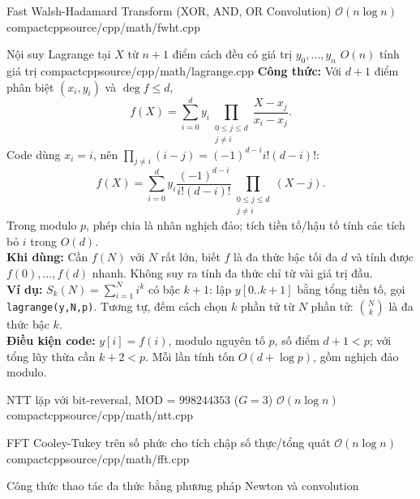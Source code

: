{Fast Walsh-Hadamard Transform (XOR, AND, OR Convolution)}
{$\mathcal{O}(n \log n)$}
{compactcpp}{source/cpp/math/fwht.cpp}

{Nội suy Lagrange tại $X$ từ $n+1$ điểm cách đều có giá trị $y_0,\dots,y_n$}
{$O(n)$ tính giá trị}
{compactcpp}{source/cpp/math/lagrange.cpp}
\textbf{Công thức:} Với $d+1$ điểm phân biệt $(x_i,y_i)$ và $\deg f\le d$,
\[
f(X)=\sum_{i=0}^{d}y_i\prod_{\substack{0\le j\le d\\j\ne i}}\frac{X-x_j}{x_i-x_j}.
\]
Code dùng $x_i=i$, nên $\prod_{j\ne i}(i-j)=(-1)^{d-i}i!(d-i)!$:
\[
f(X)=\sum_{i=0}^{d}y_i\frac{(-1)^{d-i}}{i!(d-i)!}
\prod_{\substack{0\le j\le d\\j\ne i}}(X-j).
\]
Trong modulo $p$, phép chia là nhân nghịch đảo; tích tiền tố/hậu tố tính các tích bỏ $i$ trong $O(d)$.\\
\textbf{Khi dùng:} Cần $f(N)$ với $N$ rất lớn, biết $f$ là đa thức bậc tối đa $d$ và tính được $f(0),\dots,f(d)$ nhanh. Không suy ra tính đa thức chỉ từ vài giá trị đầu.\\
\textbf{Ví dụ:} $S_k(N)=\sum_{i=1}^{N}i^k$ có bậc $k+1$: lập $y[0..k+1]$ bằng tổng tiền tố, gọi \texttt{lagrange(y,N,p)}. Tương tự, đếm cách chọn $k$ phần tử từ $N$ phần tử: $\binom{N}{k}$ là đa thức bậc $k$.\\
\textbf{Điều kiện code:} $y[i]=f(i)$, modulo nguyên tố $p$, số điểm $d+1<p$; với tổng lũy thừa cần $k+2<p$. Mỗi lần tính tốn $O(d+\log p)$, gồm nghịch đảo modulo.

{NTT lặp với bit-reversal, MOD = $998244353$ ($G=3$)}
{$\mathcal{O}(n \log n)$}
{compactcpp}{source/cpp/math/ntt.cpp}

{FFT Cooley-Tukey trên số phức cho tích chập số thực/tổng quát}
{$\mathcal{O}(n \log n)$}
{compactcpp}{source/cpp/math/fft.cpp}

{Công thức thao tác đa thức bằng phương pháp Newton và convolution}
{}
{}{}

